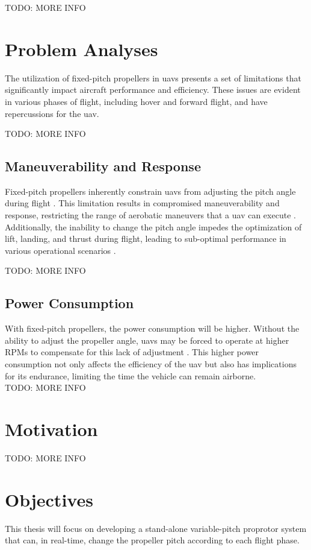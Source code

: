TODO: MORE INFO



\section{Problem Analyses}
The utilization of fixed-pitch propellers in \glspl{uav} presents a set of limitations that significantly impact aircraft performance and efficiency.
These issues are evident in various phases of flight, including hover and forward flight, and have repercussions for the \gls{uav}.

TODO: MORE INFO\\

\subsection{Maneuverability and Response}
Fixed-pitch propellers inherently constrain \glspl{uav} from adjusting the pitch angle during flight \cite{FPP1}.
This limitation results in compromised maneuverability and response, restricting the range of aerobatic maneuvers that a \gls{uav} can execute \cite{FPP1}.
Additionally, the inability to change the pitch angle impedes the optimization of lift, landing, and thrust during flight, leading to sub-optimal performance in various operational scenarios \cite{FPP1}.

TODO: MORE INFO\\

\subsection{Power Consumption}
With fixed-pitch propellers, the power consumption will be higher.
Without the ability to adjust the propeller angle, \glspl{uav} may be forced to operate at higher \gls{RPM}s to compensate for this lack of adjustment \cite{FPP1}.
This higher power consumption not only affects the efficiency of the \gls{uav} but also has implications for its endurance, limiting the time the vehicle can remain airborne.\\

TODO: MORE INFO\\

\section{Motivation}
TODO: MORE INFO\\

\section{Objectives}
This thesis will focus on developing a stand-alone variable-pitch proprotor system that can, in real-time, change the propeller pitch according to each flight phase.

